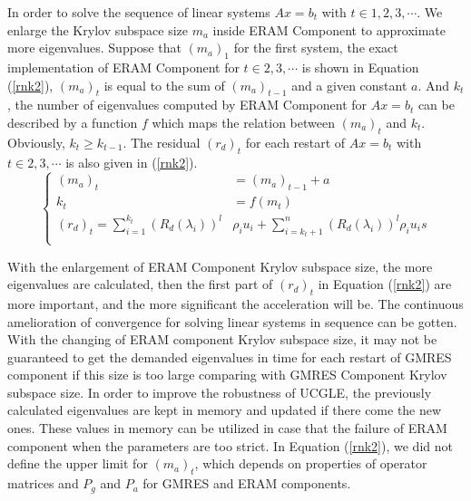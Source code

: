 In order to solve the sequence of linear systems $Ax= b_t$ with $t \in 1,2,3, \cdots$. We enlarge the Krylov subspace size $m_a$ inside ERAM Component to approximate more eigenvalues. Suppose that $(m_a)_1$ for the first system, the exact implementation of ERAM Component for $t \in 2,3, \cdots$ is shown in Equation (\ref{rnk2}), $(m_a)_t$ is equal to the sum of $(m_a)_{t-1}$ and a given constant $a$. And $k_t$, the number of eigenvalues computed by ERAM Component for $Ax=b_t$ can be described by a function $f$ which maps the relation between $(m_a)_t$ and $k_t$. Obviously, $k_t \geq k_{t-1}$. The residual $(r_d)_t$ for each restart of $Ax=b_t$ with $t \in 2,3, \cdots$ is also given in (\ref{rnk2}).
\begin{equation}
\label{rnk2} \left \{
\begin{aligned}
(m_a)_t &=  (m_a)_{t-1}+a\\
k_t &= f(m_t) \\
(r_d)_t =\sum_{i=1}^{k_t}(R_d(\lambda_i))^l &\rho_i u_i + \sum_{i=k_t+1}^{n}(R_d(\lambda_i))^l \rho_i u_is \\
\end{aligned}
\right.
\end{equation}

With the enlargement of ERAM Component Krylov subspace size, the more eigenvalues are calculated, then the first part of $(r_d)_t$ in Equation (\ref{rnk2}) are more important, and the more significant the  acceleration will be. The continuous amelioration of convergence for solving linear systems in sequence can be gotten. With the changing of ERAM component Krylov subspace size, it may not be guaranteed to get the demanded eigenvalues in time for each restart of GMRES component if this size is too large comparing with GMRES Component Krylov subspace size. In order to improve the robustness of UCGLE, the previously calculated eigenvalues are kept in memory and updated if there come the new ones. These values in memory can be utilized in case that the failure of ERAM component when the parameters are too strict. In Equation (\ref{rnk2}), we did not define the upper limit for $(m_a)_t$, which depends on properties of operator matrices and $P_g$ and $P_a$ for GMRES and ERAM components. 

